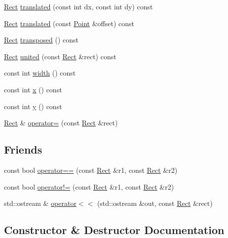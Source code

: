 \begin{DoxyCompactItemize}
\item 
\hyperlink{classprism_1_1_rect}{Rect} \hyperlink{classprism_1_1_rect_accc97050ae8799c21cd64500b1a783dd}{translated} (const int dx, const int dy) const 
\item 
\hyperlink{classprism_1_1_rect}{Rect} \hyperlink{classprism_1_1_rect_ac71993c5f890157af1e3fa86423f8198}{translated} (const \hyperlink{classprism_1_1_point}{Point} \&offset) const 
\item 
\hyperlink{classprism_1_1_rect}{Rect} \hyperlink{classprism_1_1_rect_aa4f9bf21ac8c5a1d1b415df78ef5c0da}{transposed} () const 
\item 
\hyperlink{classprism_1_1_rect}{Rect} \hyperlink{classprism_1_1_rect_ac938b0ebead7062111728b6d2392e38a}{united} (const \hyperlink{classprism_1_1_rect}{Rect} \&rect) const 
\item 
const int \hyperlink{classprism_1_1_rect_a8dae47a50fdac7a5f7e8aabef68437aa}{width} () const 
\item 
const int \hyperlink{classprism_1_1_rect_a202fa9a56964c9111a968fb9b420f5f4}{x} () const 
\item 
const int \hyperlink{classprism_1_1_rect_a6e951744e0bba0fed781b86ab0be680b}{y} () const 
\item 
\hyperlink{classprism_1_1_rect}{Rect} \& \hyperlink{classprism_1_1_rect_a1addf86103e655c776e4e20dd3c97a84}{operator=} (const \hyperlink{classprism_1_1_rect}{Rect} \&rect)
\end{DoxyCompactItemize}
\subsection*{Friends}
\begin{DoxyCompactItemize}
\item 
const bool \hyperlink{classprism_1_1_rect_ab32eafa53d6e2fedc5c4f4beeb10d12a}{operator==} (const \hyperlink{classprism_1_1_rect}{Rect} \&r1, const \hyperlink{classprism_1_1_rect}{Rect} \&r2)
\item 
const bool \hyperlink{classprism_1_1_rect_a649643043218228aae2b7d95e1a95dba}{operator!=} (const \hyperlink{classprism_1_1_rect}{Rect} \&r1, const \hyperlink{classprism_1_1_rect}{Rect} \&r2)
\item 
std\+::ostream \& \hyperlink{classprism_1_1_rect_a729ddc4e5633a601a2813d124209056f}{operator$<$$<$} (std\+::ostream \&out, const \hyperlink{classprism_1_1_rect}{Rect} \&rect)
\end{DoxyCompactItemize}


\subsection{Constructor \& Destructor Documentation}

